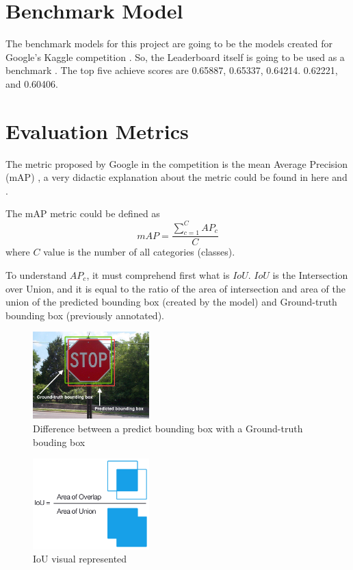 \documentclass[11pt, a4paper, twocolumn]{article}
\begin{document}
\section{Benchmark Model}

The benchmark models for this project are going to be the models created for Google's Kaggle competition \cite{kaggle}. So, the Leaderboard itself is going to be used as a benchmark \cite{leaderboard}. The top five achieve scores are 0.65887, 0.65337, 0.64214. 0.62221, and 0.60406.

\section{Evaluation Metrics}

The metric proposed by Google in the competition is the mean Average Precision (mAP) \cite{map}, a very didactic explanation about the metric could be found in here \cite{medium:1} and \cite{medium:2}.

The mAP metric could be defined as
{\centering
	\begin{equation*}
	mAP = \frac{\sum\limits_{c=1}^{C}AP_c} {C}
	\end{equation*}}
where $C$ value is the number of all categories (classes).

To understand $AP_c$, it must comprehend first what is $IoU$. $IoU$ is the Intersection over Union, and it is equal to the ratio of the area of intersection and area of the union of the predicted bounding box (created by the model) and Ground-truth bounding box (previously annotated).

\begin{figure}[ht]
	
	\centering
	\includegraphics[width=0.4\textwidth]{iou_stop_sign.jpg}
	\caption{\scriptsize  Difference between a predict bounding box with a Ground-truth bouding box \cite{pyimage}}
	
\end{figure}

\begin{figure}[ht]
	
	\centering
	\includegraphics[width=0.4\textwidth]{iou_equation.png}
	\caption{\scriptsize IoU visual represented \cite{pyimage}}
	
\end{figure}
\end{document}
